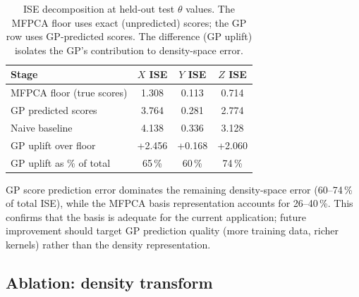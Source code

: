 \documentclass[12pt,a4paper]{article}
\newcommand{\spar}{\theta}
\begin{document}
\begin{table}[htbp]
  \centering
  \caption{ISE decomposition at held-out test $\spar$ values.
           The MFPCA floor uses exact (unpredicted) scores; the GP row
           uses GP-predicted scores.  The difference (GP uplift)
           isolates the GP's contribution to density-space error.}
  \label{tab:decomposition}
  \begin{tabular}{lccc}
    \toprule
    Stage & $X$ ISE & $Y$ ISE & $Z$ ISE \\
    \midrule
    MFPCA floor (true scores)  & 1.308 & 0.113 & 0.714 \\
    GP predicted scores        & 3.764 & 0.281 & 2.774 \\
    Naive baseline             & 4.138 & 0.336 & 3.128 \\
    \midrule
    GP uplift over floor       & +2.456 & +0.168 & +2.060 \\
    GP uplift as \% of total   & 65\,\% & 60\,\% & 74\,\% \\
    \bottomrule
  \end{tabular}
\end{table}

GP score prediction error dominates the remaining density-space error
(60--74\,\% of total ISE), while the MFPCA basis representation
accounts for 26--40\,\%.  This confirms that the basis is adequate for
the current application; future improvement should target GP prediction
quality (more training data, richer kernels) rather than the density
representation.

\subsection{Ablation: density transform}
\label{sec:ablation_transform}
\end{document}
